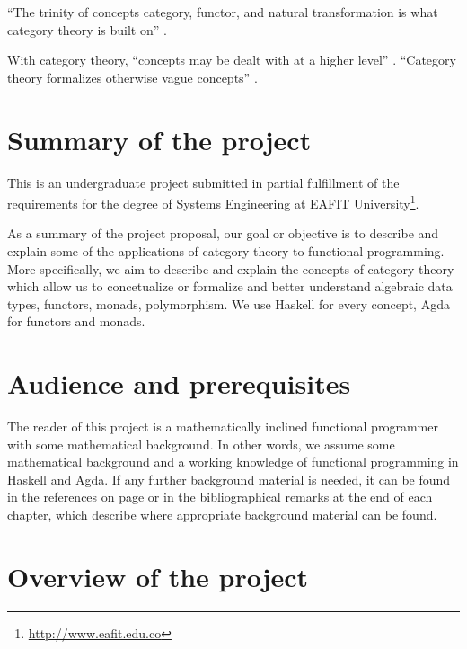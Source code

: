 ``The trinity of concepts category, functor, and natural
transformation is what category theory is built on''
\parencite{nlab-category-theory}.

With category theory, ``concepts may be dealt with at a higher level''
\parencite[xi]{pierce-1991}. ``Category theory formalizes otherwise
vague concepts'' \parencite[414]{poigne-1992}.

\section*{Summary of the project}
\label{sec:introduction-summary}

This is an undergraduate project submitted in partial fulfillment of
the requirements for the degree of Systems Engineering at EAFIT
University\footnote{\url{http://www.eafit.edu.co}}.

As a summary of the project proposal,
our goal or objective is to describe and explain some of the
applications of category theory to functional programming. More
specifically, we aim to describe and explain the concepts of category
theory which allow us to concetualize or formalize and better
understand algebraic data types, functors, monads, polymorphism. We
use Haskell for every concept, Agda for functors and monads.

\section*{Audience and prerequisites}
\label{sec:introduction-prerequisites}

The reader of this project is a mathematically inclined functional
programmer with some mathematical background. In other words, we
assume some mathematical background and a working knowledge of
functional programming in Haskell and Agda. If any further background
material is needed, it can be found in the references on page
\pageref{sec:introduction-references} or in the bibliographical
remarks at the end of each chapter, which describe where appropriate
background material can be found.

\section*{Overview of the project}
\label{sec:introduction-overview}

